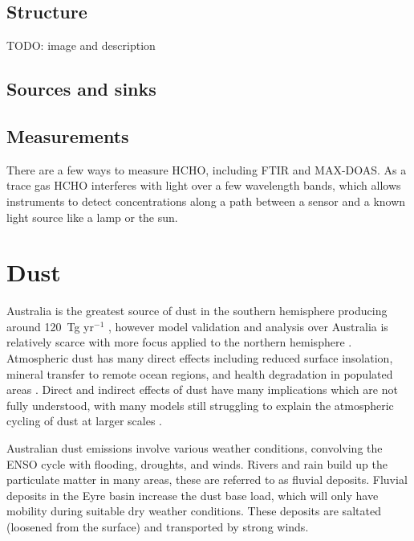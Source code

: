   \subsection{Structure}
  TODO: image and description
  
  \subsection{Sources and sinks}
    
    
  \subsection{Measurements}
    There are a few ways to measure HCHO, including FTIR and MAX-DOAS. As a trace gas HCHO interferes with light over a few wavelength bands, which allows instruments to detect concentrations along a path between a sensor and a known light source like a lamp or the sun.
  
\section{Dust}
\label{ch1:sec:dust}

  Australia is the greatest source of dust in the southern hemisphere producing around 120~Tg yr$^{-1}$ \citep{Li_2008}, however model validation and analysis over Australia is relatively scarce with more focus applied to the northern hemisphere \citep{Duncan_Fairlie_2007,Ridley_2013}.
  Atmospheric dust has many direct effects including reduced surface insolation, mineral transfer to remote ocean regions, and health degradation in populated areas \citep{Shao_2007}.
  Direct and indirect effects of dust have many implications which are not fully understood, with many models still struggling to explain the atmospheric cycling of dust at larger scales \citep{Rotstayn_2011}.

  Australian dust emissions involve various weather conditions, convolving the ENSO cycle with flooding, droughts, and winds.
  Rivers and rain build up the particulate matter in many areas, these are referred to as fluvial deposits.
  Fluvial deposits in the Eyre basin increase the dust base load, which will only have mobility during suitable dry weather conditions.
  These deposits are saltated (loosened from the surface) and transported by strong winds\citep{Zender2003}.

